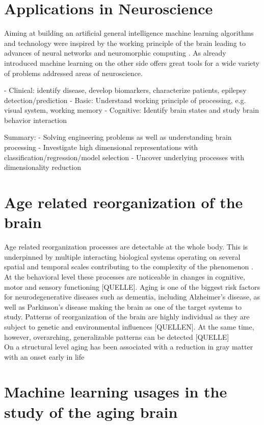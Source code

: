 \section{Applications in Neuroscience}
Aiming at building an artificial general intelligence machine learning algorithms and technology were inspired by the working principle of the brain leading to advances of neural networks \cite{Macpherson2021} and neuromorphic computing \cite{Choi2022}. As already introduced machine learning on the other side offers great tools for a wide variety of problems addressed areas of neuroscience. 

- Clinical: identify disease, develop biomarkers, characterize patients, epilepsy detection/prediction
- Basic: Understand working principle of processing, e.g. visual system, working memory
- Cognitive: Identify brain states and study brain behavior interaction

Summary: 
- Solving engineering problems as well as understanding brain processing 
- Investigate high dimensional representations with classification/regression/model selection 
- Uncover underlying processes with dimensionality reduction


\section{Age related reorganization of the brain}
Age related reorganization processes are detectable at the whole body. This is underpinned by multiple interacting biological systems operating on several spatial and temporal scales contributing to the complexity of the phenomenon \cite{Mooney2016}. At the behavioral level these processes are noticeable in changes in cognitive, motor and sensory functioning [QUELLE]. Aging is one of the biggest risk factors for neurodegenerative diseases such as dementia, including Alzheimer's disease, as well as Parkinson's disease making the brain as one of the target systems to study. Patterns of reorganization of the brain are highly individual as they are subject to genetic and environmental influences [QUELLEN]. At the same time, however, overarching, generalizable patterns can be detected [QUELLE]\\
On a structural level aging has been associated with a reduction in gray matter with an onset early in life 

\section{Machine learning usages in the study of the aging brain}

